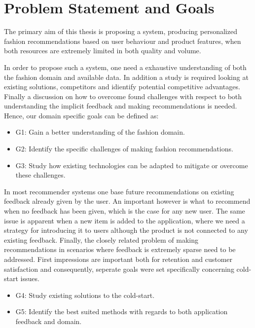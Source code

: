 \section{Problem Statement and Goals}

The primary aim of this thesis is proposing a system, producing personalized
fashion recommendations based on user behaviour and product features, when both
resources are extremely limited in both quality and volume.

In order to propose such a system, one need a exhaustive understanding of both
the fashion domain and available data. In addition a study is required looking
at existing solutions, competitors and idientify potential competitive
advantages. Finally a discussion on how to overcome found challenges with
respect to both understanding the implicit feedback and making recommendations
is needed. Hence, our domain specific goals can be defined as:

\begin{itemize}
	\item G1: Gain a better understanding of the fashion domain.
  \item G2: Identify the specific challenges of making fashion recommendations.
  \item G3: Study how existing technologies can be adapted to mitigate or
  overcome these challenges.
\end{itemize}

In most recommender systems one base future recommendations on existing
feedback already given by the user. An important however is what to recommend
when no feedback has been given, which is the case for any new user. The same
issue is apparent when a new item is added to the application, where we need a
strategy for introducing it to users although the product is not connected to
any existing feedback. Finally, the closely related problem of making
recommendations in scenarios where feedback is extremely sparse need to be
addressed. First impressions are important both for retention and customer
satisfaction and consequently, seperate goals were set specifically concerning
cold-start issues.

\begin{itemize}
  \item G4: Study existing solutions to the cold-start.
  \item G5: Identify the best suited methods with regards to both application
  feedback and domain.
\end{itemize}

